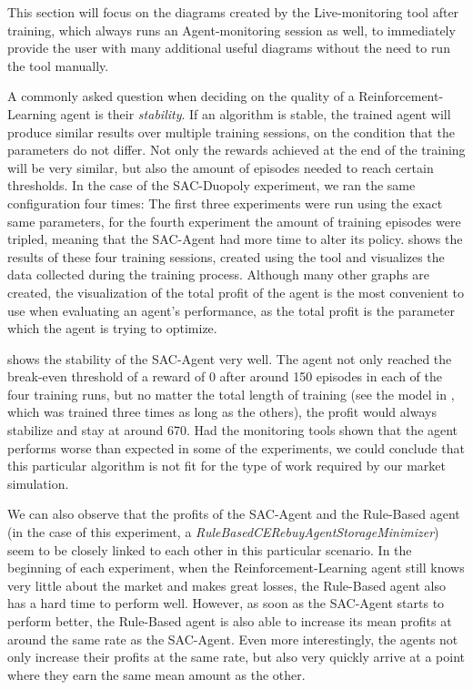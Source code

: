 This section will focus on the diagrams created by the Live-monitoring tool after training, which always runs an Agent-monitoring session as well, to immediately provide the user with many additional useful diagrams without the need to run the tool manually.

A commonly asked question when deciding on the quality of a Reinforcement-Learning agent is their \emph{stability}. If an algorithm is stable, the trained agent will produce similar results over multiple training sessions, on the condition that the parameters do not differ. Not only the rewards achieved at the end of the training will be very similar, but also the amount of episodes needed to reach certain thresholds. In the case of the SAC-Duopoly experiment, we ran the same configuration four times: The first three experiments were run using the exact same parameters, for the fourth experiment the amount of training episodes were tripled, meaning that the SAC-Agent had more time to alter its policy.  shows the results of these four training sessions, created using the  tool and visualizes the data collected during the training process. Although many other graphs are created, the visualization of the total profit of the agent is the most convenient to use when evaluating an agent's performance, as the total profit is the parameter which the agent is trying to optimize.

 shows the stability of the SAC-Agent very well. The agent not only reached the break-even threshold of a reward of 0 after around 150 episodes in each of the four training runs, but no matter the total length of training (see the model in , which was trained three times as long as the others), the profit would always stabilize and stay at around 670. Had the monitoring tools shown that the agent performs worse than expected in some of the experiments, we could conclude that this particular algorithm is not fit for the type of work required by our market simulation.

We can also observe that the profits of the SAC-Agent and the Rule-Based agent (in the case of this experiment, a \emph{RuleBasedCERebuyAgentStorageMinimizer}) seem to be closely linked to each other in this particular scenario. In the beginning of each experiment, when the Reinforcement-Learning agent still knows very little about the market and makes great losses, the Rule-Based agent also has a hard time to perform well. However, as soon as the SAC-Agent starts to perform better, the Rule-Based agent is also able to increase its mean profits at around the same rate as the SAC-Agent. Even more interestingly, the agents not only increase their profits at the same rate, but also very quickly arrive at a point where they earn the same mean amount as the other.

